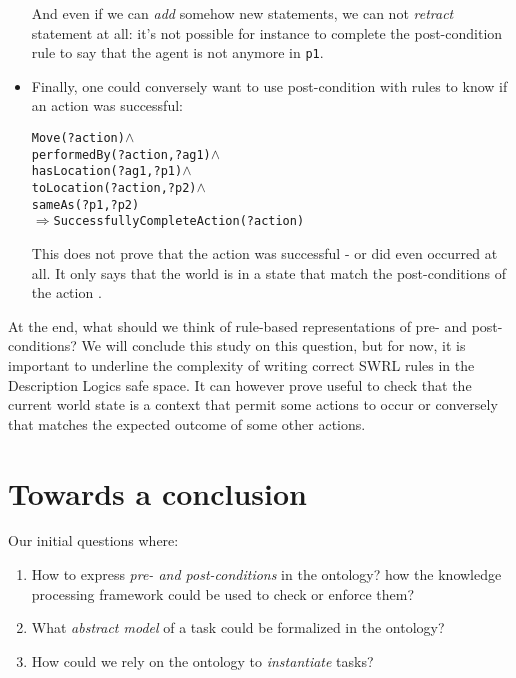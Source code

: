 \begin{itemize}
    And even if we can \emph{add} somehow new statements, we can not
    \emph{retract} statement at all: it's not possible for instance to complete
    the post-condition rule to say that the agent is not anymore in {\tt p1}.

    \item  Finally, one could conversely want to use post-condition with rules to
    know if an action was successful:


    \begin{alltt}

    Move(?action) \(\land\)
    performedBy(?action, ?ag1) \(\land\)
    hasLocation(?ag1, ?p1) \(\land\)
    toLocation(?action, ?p2) \(\land\)
    sameAs(?p1, ?p2)
    \(\Rightarrow\) SuccessfullyCompleteAction(?action)

    \end{alltt}

    This does not prove that the action was successful - or did even occurred at
    all. It only says that the world is in a state that match the post-conditions
    of the action .

\end{itemize}

At the end, what should we think of rule-based representations of pre- and
post-conditions? We will conclude this study on this question, but for now, it
is important to underline the complexity of writing correct SWRL rules in the
Description Logics safe space. It can however prove useful to check that the
current world state is a context that permit some actions to occur or
conversely that matches the expected outcome of some other actions.


\section{Towards a conclusion}

Our initial questions where:

\begin{enumerate}

    \item  How to express \emph{pre- and post-conditions} in the ontology? how
    the knowledge processing framework could be used to check or enforce them?

    \item  What \emph{abstract model} of a task could be formalized in the
    ontology?

    \item  How could we rely on the ontology to \emph{instantiate} tasks?

\end{enumerate}


